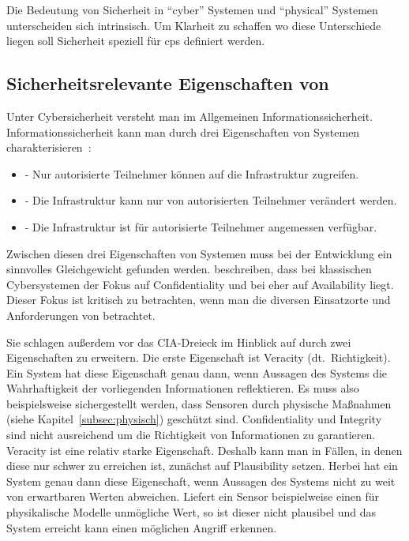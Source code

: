 
Die Bedeutung von Sicherheit in \enquote{cyber} Systemen und \enquote{physical} Systemen unterscheiden sich intrinsisch.
Um Klarheit zu schaffen wo diese Unterschiede liegen soll Sicherheit speziell für \gls{cps} definiert werden.

\subsection{Sicherheitsrelevante Eigenschaften von }\label{subsec:definition}
Unter Cybersicherheit versteht man im Allgemeinen Informationssicherheit.
Informationssicherheit kann man durch drei Eigenschaften von Systemen charakterisieren~\cite[,S.~2]{Cherdantseva2013,SFJ2017}:
\begin{itemize}[nosep]
    \item {} - Nur autorisierte Teilnehmer können auf die Infrastruktur zugreifen.
    \item {} - Die Infrastruktur kann nur von autorisierten Teilnehmer verändert werden.
    \item {} - Die Infrastruktur ist für autorisierte Teilnehmer angemessen verfügbar.
\end{itemize}

Zwischen diesen drei Eigenschaften von Systemen muss bei der Entwicklung ein sinnvolles Gleichgewicht gefunden werden.
\citeauthor{GK16} beschreiben, dass bei klassischen Cybersystemen der Fokus auf Confidentiality und bei \cps eher auf Availability liegt.
Dieser Fokus ist kritisch zu betrachten, wenn man die diversen Einsatzorte und Anforderungen von \cps betrachtet.

Sie schlagen außerdem vor das CIA-Dreieck im Hinblick auf \cps durch zwei Eigenschaften zu erweitern.
Die erste Eigenschaft ist Veracity (dt.~Richtigkeit).
Ein System hat diese Eigenschaft genau dann, wenn Aussagen des Systems die Wahrhaftigkeit der vorliegenden Informationen reflektieren.
Es muss also beispielsweise sichergestellt werden, dass Sensoren durch physische Maßnahmen (siehe Kapitel~\ref{subsec:physisch}) geschützt sind.
Confidentiality und Integrity sind nicht ausreichend um die Richtigkeit von Informationen zu garantieren.
Veracity ist eine relativ starke Eigenschaft.
Deshalb kann man in Fällen, in denen diese nur schwer zu erreichen ist, zunächst auf Plausibility setzen.
Herbei hat ein System genau dann diese Eigenschaft, wenn Aussagen des Systems nicht zu weit von erwartbaren Werten abweichen.
Liefert ein Sensor beispielweise einen für physikalische Modelle unmögliche Wert, so ist dieser nicht plausibel und das System erreicht kann einen möglichen Angriff erkennen. \cite{GK16}

